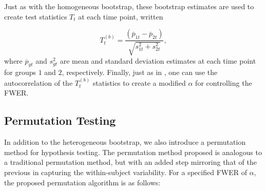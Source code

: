 Just as with the homogeneous bootstrap, these bootstrap estimates are used to create test statistics $T_t$ at each time point, written

\begin{equation}
T_t^{(b)} = \frac{(\overline{p}_{1t} - \overline{p}_{2t})}{\sqrt{s_{1t}^2 + s_{2t}^2}},
\end{equation}
where $\overline{p}_{gt}$ and $s_{gt}^2$ are mean and standard deviation estimates at each time point for groups $1$ and $2$, respectively. Finally, just as in \citet{oleson2017detecting}, one can use the autocorrelation of the $T_t^{(b)}$ statistics to create a modified $\alpha$ for controlling the FWER.



\subsection{Permutation Testing}

In addition to the heterogeneous bootstrap, we also introduce a permutation method for hypothesis testing. The permutation method proposed is analogous to a traditional permutation method, but with an added step mirroring that of the previous in capturing the within-subject variability. For a specified FWER of $\alpha$, the proposed permutation algorithm is as follows:


